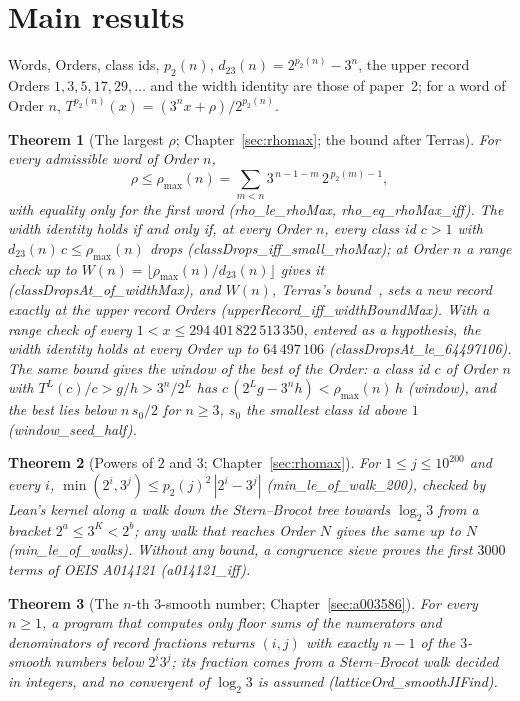 \documentclass[10pt,a4paper,titlepage]{article}
\newcommand{\lean}[1]{\textsf{#1}}
\newtheorem{mainthm}{Theorem}
\begin{document}
\section*{Main results}

Words, Orders, class ids, $p_2(n)$, $d_{23}(n) = 2^{p_2(n)} - 3^n$, the upper record
Orders $1, 3, 5, 17, 29, \ldots$ and the width identity are those of paper~2; for a word
of Order $n$, $T^{p_2(n)}(x) = (3^n x + \rho)/2^{p_2(n)}$.

\begin{mainthm}[The largest $\rho$; Chapter~\ref{sec:rhomax}; the bound after Terras]
For every admissible word of Order $n$,
\[
\rho \le \rho_{\max}(n) = \sum_{m<n} 3^{\,n-1-m}\,2^{\,p_2(m)-1},
\]
with equality only for the first word (\lean{rho\_le\_rhoMax}, \lean{rho\_eq\_rhoMax\_iff}). The width
identity holds if and only if, at every Order $n$, every class id $c > 1$ with
$d_{23}(n)\,c \le \rho_{\max}(n)$ drops (\lean{classDrops\_iff\_small\_rhoMax}); at Order $n$ a range check up to
$W(n) = \lfloor \rho_{\max}(n)/d_{23}(n) \rfloor$ gives it (\lean{classDropsAt\_of\_widthMax}), and $W(n)$, Terras's bound~\cite[Thm.~2.10]{Terras1976}, sets a new record exactly at the upper
record Orders (\lean{upperRecord\_iff\_widthBoundMax}). With a range check of every
$1 < x \le 294\,401\,822\,513\,350$, entered as a hypothesis, the width identity holds at
every Order up to $64\,497\,106$ (\lean{classDropsAt\_le\_64497106}). The same bound gives the
window of the best of the Order: a class id $c$ of Order $n$ with $T^L(c)/c > g/h > 3^n/2^L$ has
$c\,(2^L g - 3^n h) < \rho_{\max}(n)\,h$ (\lean{window}), and the best lies below $n\,s_0/2$ for
$n \ge 3$, $s_0$ the smallest class id above $1$ (\lean{window\_seed\_half}).
\end{mainthm}

\begin{mainthm}[Powers of $2$ and $3$; Chapter~\ref{sec:rhomax}]
For $1 \le j \le 10^{200}$ and every $i$,
$\min(2^i, 3^j) \le p_2(j)^2\,|2^i - 3^j|$ (\lean{min\_le\_of\_walk\_200}), checked by
Lean's kernel along a walk down the Stern--Brocot tree towards $\log_2 3$ from a bracket
$2^a \le 3^K < 2^b$; any walk that reaches Order $N$ gives the same up to $N$
(\lean{min\_le\_of\_walks}). Without any bound, a congruence sieve proves the first
$3000$ terms of OEIS A014121 (\lean{a014121\_iff}).
\end{mainthm}

\begin{mainthm}[The $n$-th $3$-smooth number; Chapter~\ref{sec:a003586}]
For every $n \ge 1$, a program that computes only floor sums of the numerators and
denominators of record fractions returns $(i, j)$ with exactly $n - 1$ of the $3$-smooth
numbers below $2^i 3^j$; its fraction comes from a Stern--Brocot walk decided in
integers, and no convergent of $\log_2 3$ is assumed (\lean{latticeOrd\_smoothJIFind}).
\end{mainthm}
\end{document}
